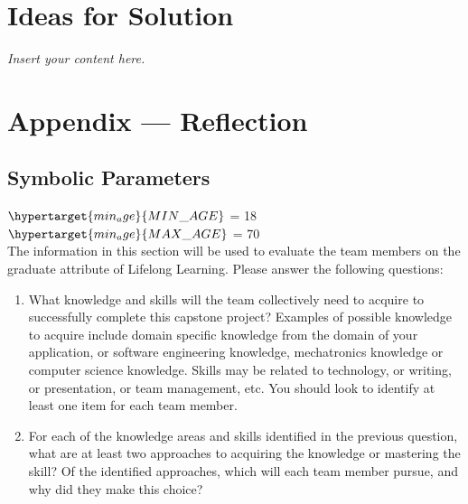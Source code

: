 \documentclass[12pt]{article}
\newcommand{\lips}{\textit{Insert your content here.}}
\begin{document}
\section{Ideas for Solution}
\lips

\newpage{}
\section*{Appendix --- Reflection}
\subsection{Symbolic Parameters}
$\hypertarget{min_age}{MIN\_AGE}$ = 18\\
$\hypertarget{min_age}{MAX\_AGE}$ = 70\\

The information in this section will be used to evaluate the team members on the
graduate attribute of Lifelong Learning.  Please answer the following questions:

\begin{enumerate}
  \item What knowledge and skills will the team collectively need to acquire to
  successfully complete this capstone project?  Examples of possible knowledge
  to acquire include domain specific knowledge from the domain of your
  application, or software engineering knowledge, mechatronics knowledge or
  computer science knowledge.  Skills may be related to technology, or writing,
  or presentation, or team management, etc.  You should look to identify at
  least one item for each team member.
  \item For each of the knowledge areas and skills identified in the previous
  question, what are at least two approaches to acquiring the knowledge or
  mastering the skill?  Of the identified approaches, which will each team
  member pursue, and why did they make this choice?
\end{enumerate}
\end{document}
